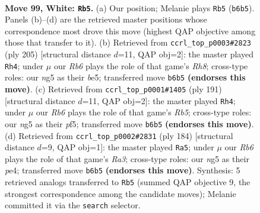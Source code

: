 \documentclass[11pt]{article}
\begin{document}
\clearpage

\begin{figure}[p]\centering
\begin{subfigure}{0.46\textwidth}\centering
\resizebox{\linewidth}{!}{%
\newchessgame
\chessboard[
  setfen={8/3k4/PR6/6n1/8/7r/4K3/8 w - - 25 99},
  showmover=false,
  pgfstyle=straightmove, color=movearrow, markmove={b6-b5}
]}
\caption{}
\end{subfigure}\hfill
\begin{subfigure}{0.46\textwidth}\centering
\resizebox{\linewidth}{!}{%
\newchessgame
\chessboard[
  setfen={6R1/4k3/4p3/4B3/8/8/4K3/7r b - - 2 103},
  showmover=false,
  pgfstyle=straightmove, color=movearrow, markmove={h1-h4}
]}
\caption{}
\end{subfigure}
\\[4pt]
\begin{subfigure}{0.46\textwidth}\centering
\resizebox{\linewidth}{!}{%
\newchessgame
\chessboard[
  setfen={8/R7/5p1k/5P2/1r6/5K2/8/8 b - - 5 96},
  showmover=false,
  pgfstyle=straightmove, color=movearrow, markmove={b4-h4}
]}
\caption{}
\end{subfigure}\hfill
\begin{subfigure}{0.46\textwidth}\centering
\resizebox{\linewidth}{!}{%
\newchessgame
\chessboard[
  setfen={8/7r/8/8/4p3/R3P3/2k3K1/8 w - - 6 93},
  showmover=false,
  pgfstyle=straightmove, color=movearrow, markmove={a3-a5}
]}
\caption{}
\end{subfigure}
\caption{\textbf{Move 99, White: \texttt{Rb5}.} (a) Our position; Melanie plays \texttt{Rb5} (\texttt{b6b5}). Panels (b)--(d) are the retrieved master positions whose correspondence most drove this move (highest QAP objective among those that transfer to it). (b) Retrieved from \texttt{ccrl\_top\_p0003\#2823} (ply 205) [structural distance $d$=11, QAP obj=2]: the master played \texttt{Rh4}; under $\mu$ our \emph{Rb6} plays the role of that game's \emph{Rh8}; cross-type roles: our \emph{n}g5 as their \emph{b}e5; transferred move \texttt{b6b5} \textbf{(endorses this move)}. (c) Retrieved from \texttt{ccrl\_top\_p0001\#1405} (ply 191) [structural distance $d$=11, QAP obj=2]: the master played \texttt{Rh4}; under $\mu$ our \emph{Rb6} plays the role of that game's \emph{Rb5}; cross-type roles: our \emph{n}g5 as their \emph{p}f5; transferred move \texttt{b6b5} \textbf{(endorses this move)}. (d) Retrieved from \texttt{ccrl\_top\_p0002\#2831} (ply 184) [structural distance $d$=9, QAP obj=1]: the master played \texttt{Ra5}; under $\mu$ our \emph{Rb6} plays the role of that game's \emph{Ra3}; cross-type roles: our \emph{n}g5 as their \emph{p}e4; transferred move \texttt{b6b5} \textbf{(endorses this move)}. Synthesis: 5 retrieved analogs transferred to \texttt{Rb5} (summed QAP objective 9, the strongest correspondence among the candidate moves); Melanie committed it via the \texttt{search} selector.}
\label{fig:thought-m196}
\end{figure}
\end{document}
